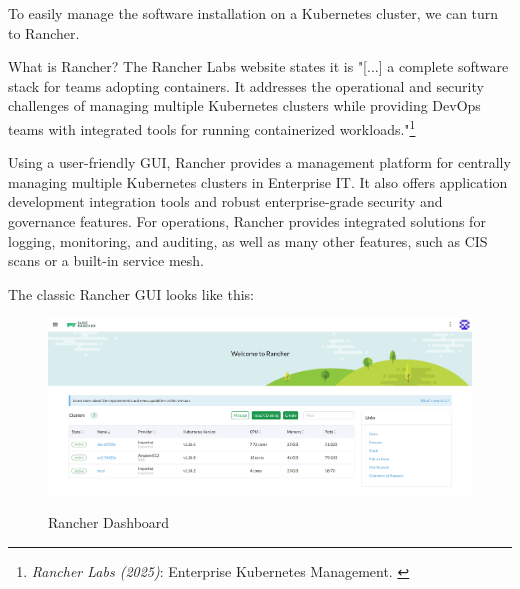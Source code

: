 To easily manage the software installation on a Kubernetes cluster, we can turn to Rancher.

What is Rancher? The Rancher Labs website states it is "[...] a complete software stack for teams adopting containers. It addresses the operational and security challenges of managing multiple Kubernetes clusters while providing DevOps teams with integrated tools for running containerized workloads."\footnote{\textit{Rancher Labs (2025)}: Enterprise Kubernetes Management. \cite{rancher}}

Using a user-friendly GUI, Rancher provides a management platform for centrally managing multiple Kubernetes clusters in Enterprise IT. It also offers application development integration tools and robust enterprise-grade security and governance features. For operations, Rancher provides integrated solutions for logging, monitoring, and auditing, as well as many other features, such as CIS scans or a built-in service mesh.

The classic Rancher GUI looks like this:

\begin{figure}[H]
\centering
\caption {Rancher Dashboard}
\includegraphics[width=\linewidth]{images/rancher-dashboard.png}
\label{fig:rancherDashboard}
\end{figure}
